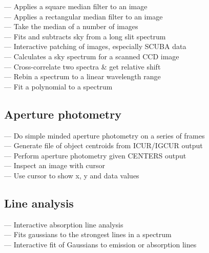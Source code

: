  --- Applies a square median filter to an image\\
 --- Applies a rectangular median filter to an image\\
 --- Take the median of a number of images\\
 --- Fits and subtracts sky from a long slit spectrum\\
 --- Interactive patching of images, especially SCUBA data\\
 --- Calculates a sky spectrum for a scanned CCD image\\
 --- Cross-correlate two spectra \& get relative shift\\
 --- Rebin a spectrum to a linear wavelength range\\
 --- Fit a polynomial to a spectrum


\subsection{\label{classifphotom}Aperture photometry}

 --- Do simple minded aperture photometry on a series of frames\\
 --- Generate file of object centroids from ICUR/IGCUR output\\
 --- Perform aperture photometry given CENTERS output\\
 --- Inspect an image with cursor\\
 --- Use cursor to show x, y and data values


\subsection{\label{classiflinfit}Line analysis}

 --- Interactive absorption line analysis\\
 --- Fits gaussians to the strongest lines in a spectrum\\
 --- Interactive fit of Gaussians to emission or absorption lines

